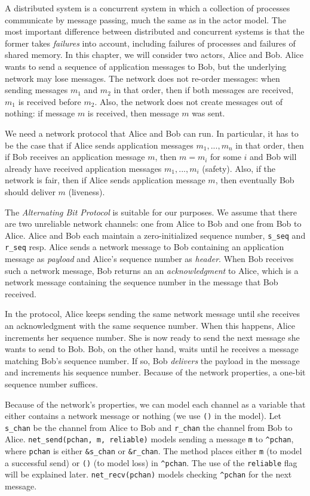 \documentclass{report}
\begin{document}
A distributed system is a concurrent system in which a collection
of processes communicate by message passing, much the same as
in the actor model.
The most important difference between distributed and concurrent
systems is that the former takes \emph{failures}
into account,
including failures of processes and failures of shared memory.
In this chapter, we will consider two actors, Alice and Bob.
Alice wants to send a sequence of application messages to Bob,
but the underlying network may lose messages.
The network does not re-order messages: when sending messages
$m_1$ and $m_2$ in that order, then if both messages are received,
$m_1$ is received before $m_2$.
Also, the network does not create messages out of nothing: if
message $m$ is received, then message $m$ was sent.

We need a network protocol that Alice and Bob can run.
In particular, it has to be the case that if Alice sends application
messages $m_1, ..., m_n$ in that order, then if Bob receives an
application message
$m$, then $m = m_i$ for some $i$ and Bob will already have received
application messages $m_1, ..., m_i$ (safety).
Also, if the network is fair, then if Alice sends application message
$m$, then eventually Bob should deliver $m$ (liveness).

The \emph{Alternating Bit Protocol} is suitable for our purposes.
We assume that there are two unreliable network channels: one from Alice
to Bob and one from Bob to Alice.
Alice and Bob each maintain a zero-initialized sequence number,
\texttt{s\_seq} and \texttt{r\_seq} resp.
Alice sends a network message to Bob containing an
application message as \emph{payload} and Alice's sequence number
as \emph{header}.
When Bob receives such a network message, Bob returns an
an \emph{acknowledgment} to Alice, which is a network message
containing the sequence number in the message that Bob received.

In the protocol, Alice keeps sending the same network message until she
receives an acknowledgment with the same sequence number.
When this happens, Alice increments her sequence number.  She is now
ready to send the next message she wants to send to Bob.
Bob, on the other hand, waits until he receives a message matching
Bob's sequence number.  If so, Bob \emph{delivers} the payload in the
message and increments his sequence number.
Because of the network properties,  a one-bit sequence number suffices.

Because of the network's properties, we can model each
channel as a variable that either contains a network message or nothing
(we use \texttt{()} in the model).  Let \texttt{s\_chan} be the channel
from Alice to Bob and \texttt{r\_chan} the channel from Bob to Alice.
\texttt{net\_send(pchan, m, reliable)} models sending a message \texttt{m} to
\texttt{\^{}pchan}, where \texttt{pchan} is either \texttt{\&s\_chan}
or \texttt{\&r\_chan}.
The method places either \texttt{m} (to model a successful send)
or \texttt{()} (to model loss) in \texttt{\^{}pchan}.
The use of the \texttt{reliable} flag will be explained later.
\texttt{net\_recv(pchan)} models checking \texttt{\^{}pchan} for
the next message.
\end{document}
